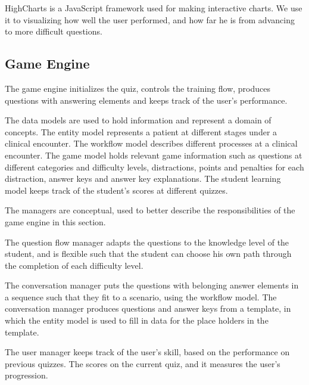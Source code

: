 HighCharts \parencite{Highsoft} is a JavaScript framework used for making interactive charts. We use it to visualizing how well the user performed, and how far he is from advancing to more difficult questions.  

\subsection{Game Engine} 
The game engine initializes the quiz, controls the training flow, produces questions with answering elements and keeps track of the user's performance. 

The data models are used to hold information and represent a domain of concepts. The entity model represents a patient at different stages under a clinical encounter. The workflow model describes different processes at a clinical encounter. The game model holds relevant game information such as questions at different categories and difficulty levels, distractions, points and penalties for each distraction, answer keys and answer key explanations. The student learning model keeps track of the student's scores at different quizzes.

The managers are conceptual, used to better describe the responsibilities of the game engine in this section. 

The question flow manager adapts the questions to the knowledge level of the student, and is flexible such that the student can choose his own path through the completion of each difficulty level. 

The conversation manager puts the questions with belonging answer elements in a sequence such that they fit to a scenario, using the workflow model. The conversation manager produces questions and answer keys from a template, in which the entity model is used to fill in data for the place holders in the template.

The user manager keeps track of the user's skill, based on the performance on previous quizzes. The scores on the current quiz, and it measures the user's progression. 
